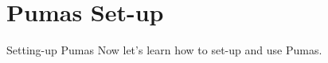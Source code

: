 
\section{Pumas Set-up}
\begin{frame}{Setting-up Pumas}
    Now let's learn how to set-up and use Pumas.
\end{frame}
